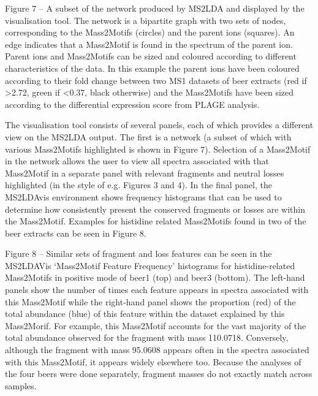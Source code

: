 Figure 7 – A subset of the network produced by MS2LDA and displayed by the visualisation tool. The network is a bipartite graph with two sets of nodes, corresponding to the Mass2Motifs (circles) and the parent ions (squares). An edge indicates that a Mass2Motif is found in the spectrum of the parent ion. Parent ions and Mass2Motifs can be sized and coloured according to different characteristics of the data. In this example the parent ions have been coloured according to their fold change between two MS1 datasets of beer extracts (red if >2.72, green if <0.37, black otherwise) and the Mass2Motifs have been sized according to the differential expression score from PLAGE analysis.

The visualisation tool consists of several panels, each of which provides a different view on the MS2LDA output. The first is a network (a subset of which with various Mass2Motifs highlighted is shown in Figure 7). Selection of a Mass2Motif in the network allows the user to view all spectra associated with that Mass2Motif in a separate panel with relevant fragments and neutral losses highlighted (in the style of e.g. Figures 3 and 4). In the final panel, the MS2LDAvis environment shows frequency histograms that can be used to determine how consistently present the conserved fragments or losses are within the Mass2Motif. Examples for histidine related Mass2Motifs found in two of the beer extracts can be seen in Figure 8.

Figure 8 – Similar sets of fragment and loss features can be seen in the MS2LDAVis ‘Mass2Motif Feature Frequency’ histograms for histidine-related Mass2Motifs in positive mode of beer1 (top) and beer3 (bottom). The left-hand panels show the number of times each feature appears in spectra associated with this Mass2Motif while the right-hand panel shows the proportion (red) of the total abundance (blue) of this feature within the dataset explained by this Mass2Morif. For example, this Mass2Motif accounts for the vast majority of the total abundance observed for the fragment with mass 110.0718. Conversely, although the fragment with mass 95.0608 appears often in the spectra associated with this Mass2Motif, it appears widely elsewhere too. Because the analyses of the four beers were done separately, fragment masses do not exactly match across samples. 

